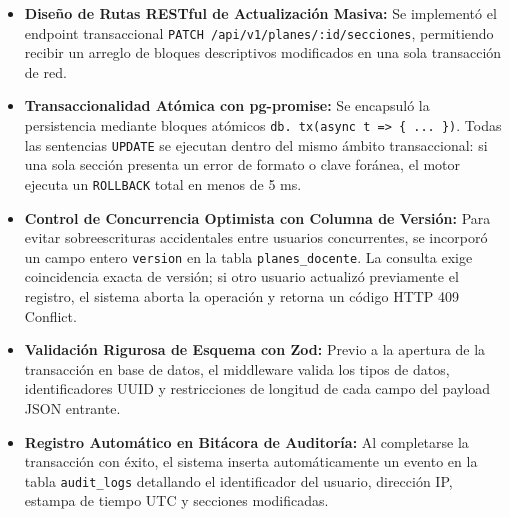 \documentclass[12pt,a4paper]{article}
\begin{document}
\begin{itemize}[leftmargin=1.5em, itemsep=4pt]
    \item \textbf{Diseño de Rutas RESTful de Actualización Masiva:} Se implementó el endpoint transaccional \texttt{PATCH /\allowbreak  api/\allowbreak  v1/\allowbreak  planes/\allowbreak  :id/\allowbreak  secciones}, permitiendo recibir un arreglo de bloques descriptivos modificados en una sola transacción de red.
    \item \textbf{Transaccionalidad Atómica con pg-promise:} Se encapsuló la persistencia mediante bloques atómicos \texttt{db. tx(async t => \{ ... \})}. Todas las sentencias \texttt{UPDATE} se ejecutan dentro del mismo ámbito transaccional: si una sola sección presenta un error de formato o clave foránea, el motor ejecuta un \texttt{ROLLBACK} total en menos de 5 ms.
    \item \textbf{Control de Concurrencia Optimista con Columna de Versión:} Para evitar sobreescrituras accidentales entre usuarios concurrentes, se incorporó un campo entero \texttt{version} en la tabla \texttt{planes\_\allowbreak  docente}. La consulta exige coincidencia exacta de versión; si otro usuario actualizó previamente el registro, el sistema aborta la operación y retorna un código HTTP 409 Conflict.
    \item \textbf{Validación Rigurosa de Esquema con Zod:} Previo a la apertura de la transacción en base de datos, el middleware valida los tipos de datos, identificadores UUID y restricciones de longitud de cada campo del payload JSON entrante.
    \item \textbf{Registro Automático en Bitácora de Auditoría:} Al completarse la transacción con éxito, el sistema inserta automáticamente un evento en la tabla \texttt{audit\_\allowbreak  logs} detallando el identificador del usuario, dirección IP, estampa de tiempo UTC y secciones modificadas.
\end{itemize}
\end{document}

